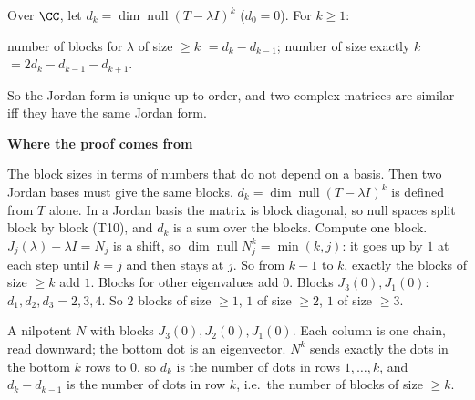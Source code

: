 \documentclass[10pt]{scrartcl}
\newenvironment{fig}{\par\needspace{9\baselineskip}\medskip\begin{center}}{\end{center}\medskip}
\newcommand{\figcap}[1]{\par\vspace{3pt}\begin{minipage}{0.86\linewidth}\small\centering #1\end{minipage}}
\DeclareMathOperator{\nul}{null}
\newenvironment{motive}{\begin{mdframed}[style=thinkbox]\textbf{\color{OliveGreen!75!black}Where the proof comes from}\begin{description}[leftmargin=0.9em,labelindent=0pt,itemsep=2pt,topsep=2pt,font=\normalfont\bfseries\color{OliveGreen!70!black}]}{\end{description}\end{mdframed}}
\begin{document}
\begin{theorem*}
  Over $\CC$, let $d_k=\dim\nul(T-\lambda I)^k$ ($d_0=0$). For $k\ge1$:
  \begin{itemize}
    \ii number of blocks for $\lambda$ of size $\ge k$ $=d_k-d_{k-1}$;
    \ii number of size exactly $k$ $=2d_k-d_{k-1}-d_{k+1}$.
  \end{itemize}
  So the Jordan form is unique up to order, and two complex matrices are similar iff they have the same Jordan form.
\end{theorem*}
\begin{motive}
  \ii[Want.] The block sizes in terms of numbers that do not depend on a basis. Then two Jordan bases must give the same blocks.
  \ii[Know.] $d_k=\dim\nul(T-\lambda I)^k$ is defined from $T$ alone. In a Jordan basis the matrix is block diagonal, so null spaces split block by block (T10), and $d_k$ is a sum over the blocks.
   Compute one block. $J_j(\lambda)-\lambda I=N_j$ is a shift, so $\dim\nul N_j^k=\min(k,j)$: it goes up by $1$ at each step until $k=j$ and then stays at $j$. So from $k-1$ to $k$, exactly the blocks of size $\ge k$ add $1$. Blocks for other eigenvalues add $0$.
  \ii[Example.] Blocks $J_3(0),J_1(0)$: $d_1,d_2,d_3=2,3,4$. So $2$ blocks of size $\ge1$, $1$ of size $\ge2$, $1$ of size $\ge3$.
\end{motive}
\begin{fig}
\figcap{A nilpotent $N$ with blocks $J_3(0),J_2(0),J_1(0)$. Each column is one chain, read downward; the bottom dot is an eigenvector. $N^k$ sends exactly the dots in the bottom $k$ rows to $0$, so $d_k$ is the number of dots in rows $1,\dots,k$, and $d_k-d_{k-1}$ is the number of dots in row $k$, i.e.\ the number of blocks of size $\ge k$.}
\end{fig}
\end{document}
